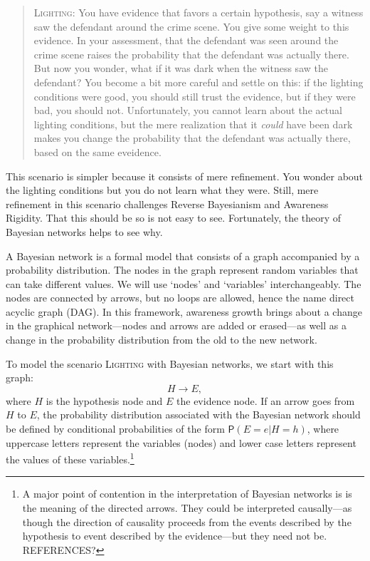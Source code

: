 \documentclass[
  11pt,
  dvipsnames,enabledeprecatedfontcommands]{scrartcl}
\newcommand{\pr}[1]{\ensuremath{\mathsf{P}(#1)}}
\begin{document}
\begin{quote}
\textsc{Lighting:} You have evidence that favors a certain hypothesis,
say a witness saw the defendant around the crime scene. You give some
weight to this evidence. In your assessment, that the defendant was seen
around the crime scene raises the probability that the defendant was
actually there. But now you wonder, what if it was dark when the witness
saw the defendant? You become a bit more careful and settle on this: if
the lighting conditions were good, you should still trust the evidence,
but if they were bad, you should not. Unfortunately, you cannot learn
about the actual lighting conditions, but the mere realization that it
\textit{could} have been dark makes you change the probability that the
defendant was actually there, based on the same eveidence.
\end{quote}

\noindent This scenario is simpler because it consists of mere
refinement. You wonder about the lighting conditions but you do not
learn what they were. Still, mere refinement in this scenario challenges
Reverse Bayesianism and Awareness Rigidity. That this should be so is
not easy to see. Fortunately, the theory of Bayesian networks helps to
see why.

A Bayesian network is a formal model that consists of a graph
accompanied by a probability distribution. The nodes in the graph
represent random variables that can take different values. We will use
`nodes' and `variables' interchangeably. The nodes are connected by
arrows, but no loops are allowed, hence the name direct acyclic graph
(DAG). In this framework, awareness growth brings about a change in the
graphical network---nodes and arrows are added or erased---as well as a
change in the probability distribution from the old to the new network.

To model the scenario \textsc{Lighting} with Bayesian networks, we start
with this graph: \[H \rightarrow E,\] where \(H\) is the hypothesis node
and \(E\) the evidence node. If an arrow goes from \(H\) to \(E\), the
probability distribution associated with the Bayesian network should be
defined by conditional probabilities of the form \(\pr{E=e \vert H=h}\),
where uppercase letters represent the variables (nodes) and lower case
letters represent the values of these variables.\footnote{A major point
  of contention in the interpretation of Bayesian networks is is the
  meaning of the directed arrows. They could be interpreted
  causally---as though the direction of causality proceeds from the
  events described by the hypothesis to event described by the
  evidence---but they need not be. REFERENCES?}
\end{document}
